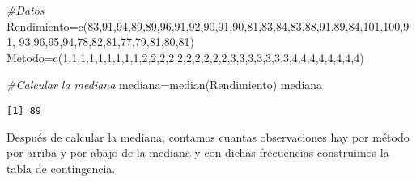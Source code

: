 \documentclass[
  a4paper,
  oneside,
  openany]{book}
\newenvironment{Shaded}{\begin{snugshade}}{\end{snugshade}}
\newcommand{\CommentTok}[1]{\textcolor[rgb]{0.56,0.35,0.01}{\textit{#1}}}
\newcommand{\DecValTok}[1]{\textcolor[rgb]{0.00,0.00,0.81}{#1}}
\newcommand{\FunctionTok}[1]{\textcolor[rgb]{0.00,0.00,0.00}{#1}}
\newcommand{\NormalTok}[1]{#1}
\newcommand{\OtherTok}[1]{\textcolor[rgb]{0.56,0.35,0.01}{#1}}
\begin{document}
\begin{Shaded}
\begin{Highlighting}[]
\CommentTok{\#Datos}
\NormalTok{Rendimiento}\OtherTok{=}\FunctionTok{c}\NormalTok{(}\DecValTok{83}\NormalTok{,}\DecValTok{91}\NormalTok{,}\DecValTok{94}\NormalTok{,}\DecValTok{89}\NormalTok{,}\DecValTok{89}\NormalTok{,}\DecValTok{96}\NormalTok{,}\DecValTok{91}\NormalTok{,}\DecValTok{92}\NormalTok{,}\DecValTok{90}\NormalTok{,}\DecValTok{91}\NormalTok{,}\DecValTok{90}\NormalTok{,}\DecValTok{81}\NormalTok{,}\DecValTok{83}\NormalTok{,}\DecValTok{84}\NormalTok{,}\DecValTok{83}\NormalTok{,}\DecValTok{88}\NormalTok{,}\DecValTok{91}\NormalTok{,}\DecValTok{89}\NormalTok{,}\DecValTok{84}\NormalTok{,}\DecValTok{101}\NormalTok{,}\DecValTok{100}\NormalTok{,}\DecValTok{91}\NormalTok{,}
              \DecValTok{93}\NormalTok{,}\DecValTok{96}\NormalTok{,}\DecValTok{95}\NormalTok{,}\DecValTok{94}\NormalTok{,}\DecValTok{78}\NormalTok{,}\DecValTok{82}\NormalTok{,}\DecValTok{81}\NormalTok{,}\DecValTok{77}\NormalTok{,}\DecValTok{79}\NormalTok{,}\DecValTok{81}\NormalTok{,}\DecValTok{80}\NormalTok{,}\DecValTok{81}\NormalTok{)}
\NormalTok{Metodo}\OtherTok{=}\FunctionTok{c}\NormalTok{(}\DecValTok{1}\NormalTok{,}\DecValTok{1}\NormalTok{,}\DecValTok{1}\NormalTok{,}\DecValTok{1}\NormalTok{,}\DecValTok{1}\NormalTok{,}\DecValTok{1}\NormalTok{,}\DecValTok{1}\NormalTok{,}\DecValTok{1}\NormalTok{,}\DecValTok{1}\NormalTok{,}\DecValTok{2}\NormalTok{,}\DecValTok{2}\NormalTok{,}\DecValTok{2}\NormalTok{,}\DecValTok{2}\NormalTok{,}\DecValTok{2}\NormalTok{,}\DecValTok{2}\NormalTok{,}\DecValTok{2}\NormalTok{,}\DecValTok{2}\NormalTok{,}\DecValTok{2}\NormalTok{,}\DecValTok{2}\NormalTok{,}\DecValTok{3}\NormalTok{,}\DecValTok{3}\NormalTok{,}\DecValTok{3}\NormalTok{,}\DecValTok{3}\NormalTok{,}\DecValTok{3}\NormalTok{,}\DecValTok{3}\NormalTok{,}\DecValTok{3}\NormalTok{,}\DecValTok{4}\NormalTok{,}\DecValTok{4}\NormalTok{,}\DecValTok{4}\NormalTok{,}\DecValTok{4}\NormalTok{,}\DecValTok{4}\NormalTok{,}\DecValTok{4}\NormalTok{,}\DecValTok{4}\NormalTok{,}\DecValTok{4}\NormalTok{)}

\CommentTok{\#Calcular la mediana}
\NormalTok{mediana}\OtherTok{=}\FunctionTok{median}\NormalTok{(Rendimiento)}
\NormalTok{mediana}
\end{Highlighting}
\end{Shaded}

\begin{verbatim}
[1] 89
\end{verbatim}

Después de calcular la mediana, contamos cuantas observaciones hay por método por arriba y por abajo de la mediana y con dichas frecuencias construimos la tabla de contingencia.
\end{document}
